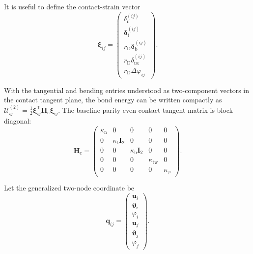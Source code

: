 It is useful to define the contact-strain vector
\begin{equation}
    \boldsymbol{\xi}_{ij} =
    \begin{pmatrix}
        \delta_{\mathrm{n}}^{(ij)} \\
        \boldsymbol{\delta}_{\mathrm{t}}^{(ij)} \\
        r_{\mathrm{D}}\boldsymbol{\delta}_{\mathrm{b}}^{(ij)} \\
        r_{\mathrm{D}}\delta_{\mathrm{tw}}^{(ij)} \\
        r_{\mathrm{D}}\Delta\varphi_{ij}
    \end{pmatrix}.
\end{equation}

With the tangential and bending entries understood as two-component vectors in the contact tangent plane, the bond energy can be written compactly as $\mathcal{U}_{ij}^{(2)} = \frac{1}{2} \boldsymbol{\xi}_{ij}^{\mathsf{T}} \mathbf{H}_{\mathrm{c}} \boldsymbol{\xi}_{ij}$. The baseline parity-even contact tangent matrix is block diagonal:
\begin{equation}
    \mathbf{H}_{\mathrm{c}} =
    \begin{pmatrix}
        \kappa_{\mathrm{n}} & 0 & 0 & 0 & 0 \\
        0 & \kappa_{\mathrm{t}}\mathbf{I}_2 & 0 & 0 & 0 \\
        0 & 0 & \kappa_{\mathrm{b}}\mathbf{I}_2 & 0 & 0 \\
        0 & 0 & 0 & \kappa_{\mathrm{tw}} & 0 \\
        0 & 0 & 0 & 0 & \kappa_\varphi
    \end{pmatrix}.
\end{equation}

Let the generalized two-node coordinate be
\begin{equation}
    \mathbf{q}_{ij} =
    \begin{pmatrix}
        \mathbf{u}_i \\
        \boldsymbol{\vartheta}_i \\
        \varphi_i \\
        \mathbf{u}_j \\
        \boldsymbol{\vartheta}_j \\
        \varphi_j
    \end{pmatrix}.
\end{equation}

